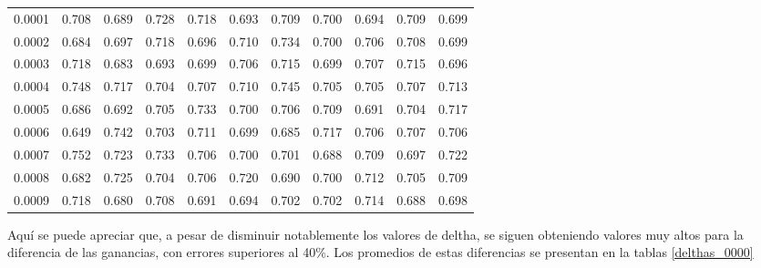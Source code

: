 \begin{table}[H]
\begin{tabular}{rrrrrrrrrrr}
0.0001                     & 0.708                & 0.689                & 0.728                & 0.718                & 0.693                & 0.709                & 0.700                & 0.694                & 0.709                & 0.699                \\
0.0002                     & 0.684                & 0.697                & 0.718                & 0.696                & 0.710                & 0.734                & 0.700                & 0.706                & 0.708                & 0.699                \\
0.0003                     & 0.718                & 0.683                & 0.693                & 0.699                & 0.706                & 0.715                & 0.699                & 0.707                & 0.715                & 0.696                \\
0.0004                     & 0.748                & 0.717                & 0.704                & 0.707                & 0.710                & 0.745                & 0.705                & 0.705                & 0.707                & 0.713                \\
0.0005                     & 0.686                & 0.692                & 0.705                & 0.733                & 0.700                & 0.706                & 0.709                & 0.691                & 0.704                & 0.717                \\
0.0006                     & 0.649                & 0.742                & 0.703                & 0.711                & 0.699                & 0.685                & 0.717                & 0.706                & 0.707                & 0.706                \\
0.0007                     & 0.752                & 0.723                & 0.733                & 0.706                & 0.700                & 0.701                & 0.688                & 0.709                & 0.697                & 0.722                \\
0.0008                     & 0.682                & 0.725                & 0.704                & 0.706                & 0.720                & 0.690                & 0.700                & 0.712                & 0.705                & 0.709                \\
0.0009                     & 0.718                & 0.680                & 0.708                & 0.691                & 0.694                & 0.702                & 0.702                & 0.714                & 0.688                & 0.698               
\end{tabular}
\label{tabla100_10000}
\end{table}
Aquí se puede apreciar que, a pesar de disminuir notablemente los valores de deltha, se siguen obteniendo valores muy altos para la diferencia de las ganancias, con errores superiores al 40\%. Los promedios de estas diferencias se presentan en la tablas \ref{delthas_0000}


